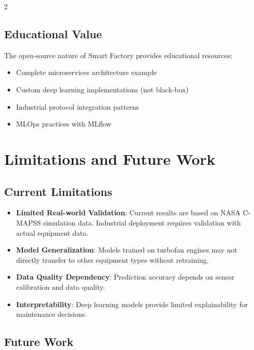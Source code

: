 \documentclass{ijceds} %
\begin{document}
\begin{multicols}{2}
\subsection{Educational Value}

The open-source nature of Smart Factory provides educational resources:

\begin{itemize}
    \item Complete microservices architecture example
    \item Custom deep learning implementations (not black-box)
    \item Industrial protocol integration patterns
    \item MLOps practices with MLflow
\end{itemize}


\section{Limitations and Future Work}
\label{sec:future-validation}

\subsection{Current Limitations}

\begin{itemize}
    \item \textbf{Limited Real-world Validation}: Current results are based on NASA C-MAPSS simulation data. Industrial deployment requires validation with actual equipment data.
    \item \textbf{Model Generalization}: Models trained on turbofan engines may not directly transfer to other equipment types without retraining.
    \item \textbf{Data Quality Dependency}: Prediction accuracy depends on sensor calibration and data quality.
    \item \textbf{Interpretability}: Deep learning models provide limited explainability for maintenance decisions.
\end{itemize}

\subsection{Future Work}


\end{multicols}
\end{document}
